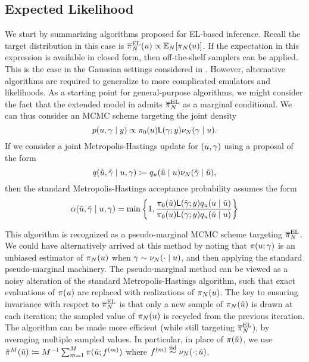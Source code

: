 \documentclass[12pt]{article}
\begin{document}
\subsection{Expected Likelihood}
We start by summarizing algorithms proposed for EL-based inference. Recall the target distribution in this 
case is $\overline{\pi}_{N}^{\mathrm{EL}}(u) \propto \mathbb{E}_{N}[\pi_{N}(u)]$. If the expectation in this 
expression is available in closed form, then off-the-shelf samplers can be applied. This is the case in the 
Gaussian settings considered in . However, alternative 
algorithms are required to generalize to more complicated emulators and likelihoods. 
As a starting point for general-purpose algorithms, we might consider the fact that the extended model 
in  admits $\overline{\pi}_{N}^{\mathrm{EL}}$ as a marginal conditional. We can thus 
consider an MCMC scheme targeting the joint density
\begin{equation}
p(u, \gamma \mid y) \propto \pi_0(u) \mathsf{L}(\gamma; y) \nu_{N}(\gamma \mid u). 
\end{equation}
If we consider a joint Metropolis-Hastings update for $(u, \gamma)$ using a proposal of the form
\begin{equation}
q(\tilde{u}, \tilde{\gamma} \mid u, \gamma)
\coloneqq q_{u}(\tilde{u} \mid u) \nu_{N}(\tilde{\gamma} \mid \tilde{u}),
\end{equation}
then the standard Metropolis-Hastings acceptance probability assumes the form
\begin{equation}
\alpha(\tilde{u}, \tilde{\gamma} \mid u, \gamma)
= \min\left\{1, \frac{\pi_0(\tilde{u}) \mathsf{L}(\tilde{\gamma}; y)q_{u}(u \mid \tilde{u})}{\pi_0(u)\mathsf{L}(\gamma; y)q_{u}(\tilde{u} \mid u)} \right\}
\end{equation}

This algorithm is recognized as a pseudo-marginal MCMC scheme targeting $\overline{\pi}_{N}^{\mathrm{EL}}$.
We could have alternatively arrived at this method by noting that $\pi(u; \gamma)$ is an unbiased 
estimator of $\pi_{N}(u)$ when $\gamma \sim \nu_{N}(\cdot \mid u)$, and then applying the standard
pseudo-marginal machinery. The pseudo-marginal method
can be viewed as a noisy alteration of the standard Metropolis-Hastings algorithm, such that exact evaluations 
of $\pi(u)$ are replaced with realizations of $\pi_{N}(u)$. The key to ensuring invariance with 
respect to $\overline{\pi}_{N}^{\mathrm{EL}}$ is that only a new sample of $\pi_{N}(\tilde{u})$ is drawn at each iteration; 
the sampled value of $\pi_{N}(u)$ is recycled from the previous iteration. The algorithm can be made more 
efficient (while still targeting $\overline{\pi}_{N}^{\mathrm{EL}}$), by averaging multiple sampled values. In particular, in place
of $\pi(\tilde{u})$, we use 
$\hat{\pi}^M(\tilde{u}) \coloneqq M^{-1} \sum_{m=1}^{M} \pi(\tilde{u}; f^{(m)})$ where 
$f^{(m)} \overset{\mathrm{iid}}{\sim} \nu_{N}(\cdot; \tilde{u})$.
\end{document}
